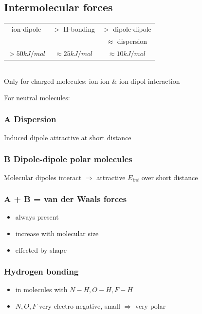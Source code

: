 \documentclass[ wastespaceontitle, english]{cheat_sheet_template}
\begin{document}
    \subsection{Intermolecular forces}
    
    \begin{tabular}{c c c}
        ion-dipole & $>$ H-bonding & $>$ dipole-dipole \\ & & $\approx$ dispersion \\
         $>50 kJ/mol$ & $\approx 25  kJ/mol$  & $\approx 10 kJ/mol$
         
    \end{tabular} \\
    
    Only for charged molecules: ion-ion \& ion-dipol interaction
    
    For neutral molecules:\\
    \subsubsection{A Dispersion}
    Induced dipole attractive at short distance \\
    \subsubsection{B Dipole-dipole polar molecules}
    Molecular dipoles interact $\Rightarrow$ attractive $E_{int}$ over short distance\\
    \subsubsection{A + B = van der Waals forces}
    \begin{itemize}
        \item always present
        \item increase with molecular size
        \item effected by shape
    \end{itemize}
    \subsubsection{Hydrogen bonding}
    \begin{itemize}
        \item in molecules with $N-H, O-H, F-H$
        \item $N,O,F$ very electro negative, small $\Rightarrow$ very polar
    \end{itemize}
    
\end{document}
